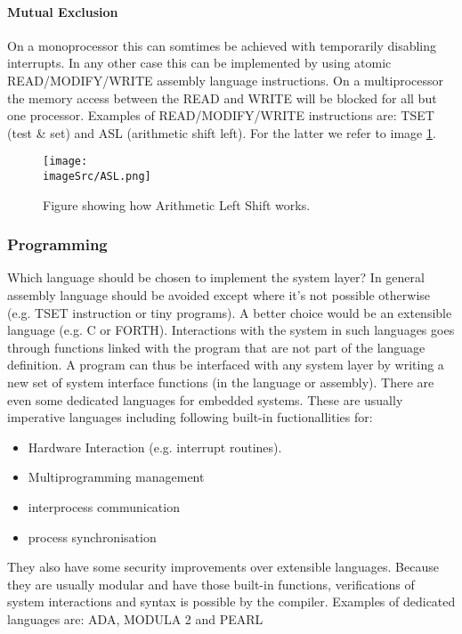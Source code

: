 \documentclass[../main.tex]{subfiles}
\renewcommand{\imageSrc}{../images/}
\begin{document}
\paragraph{Mutual Exclusion}
On a monoprocessor this can somtimes be achieved with temporarily disabling interrupts.
In any other case this can be implemented by using atomic READ/MODIFY/WRITE assembly language instructions.
On a multiprocessor the memory access between the READ and WRITE will be blocked for all but one processor.
Examples of READ/MODIFY/WRITE instructions are: TSET (test \& set) and ASL (arithmetic shift left). 
For the latter we refer to image \ref{f:asl}. 

\begin{figure}
	\centering
	\texttt{[image: \\imageSrc/ASL.png]}
	\caption{Figure showing how Arithmetic Left Shift works.}
	\label{f:asl}
\end{figure}

\subsubsection{Programming}
Which language should be chosen to implement the system layer? 
In general assembly language should be avoided except where it's not possible otherwise (e.g. TSET instruction or tiny programs).
A better choice would be an extensible language (e.g. C or FORTH).
Interactions with the system in such languages goes through functions linked with the program that are not part of the language definition. 
A program can thus be interfaced with any system layer by writing a new set of system interface functions (in the language or assembly).
There are even some dedicated languages for embedded systems. 
These are usually imperative languages including following built-in fuctionallities for:
\begin{itemize}
	\item Hardware Interaction (e.g. interrupt routines).
	\item Multiprogramming management
	\item interprocess communication
	\item process synchronisation
\end{itemize}
They also have some security improvements over extensible languages.
Because they are usually modular and have those built-in functions, verifications of system interactions and syntax is possible by the compiler.
Examples of dedicated languages are: ADA, MODULA 2 and PEARL
\end{document}
